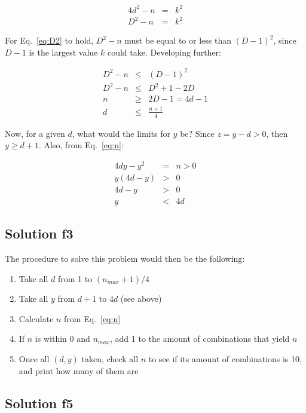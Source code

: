 \documentclass[english]{article}
\begin{document}
\begin{eqnarray}
4d^2 - n & = & k^2 \\
D^2 - n & = & k^2 \label{eq:D2}
\end{eqnarray}

For Eq.~\ref{eq:D2} to hold, $D^2 - n$ must be equal to or less than $(D-1)^2$, since $D-1$ is the largest value $k$ could take. Developing further:

\begin{eqnarray}
D^2 - n & \leq & (D-1)^2 \\
D^2 - n & \leq & D^2 + 1 -2D \\
n & \geq & 2D-1 = 4d-1 \\
d & \leq & \frac{n+1}{4}
\end{eqnarray}

Now, for a given $d$, what would the limits for $y$ be? Since $z = y-d > 0$, then $y \geq d + 1$. Also, from Eq.~\ref{eq:n}:

\begin{eqnarray}
4 d y - y^2 & = & n > 0 \\
y(4d-y) & > & 0 \\
4d - y & > & 0 \\
y & < & 4d
\end{eqnarray}

\subsection{Solution f3}

The procedure to solve this problem would then be the following:

\begin{enumerate}
  \item Take all $d$ from 1 to $(n_{max}+1)/4$
  \item Take all $y$ from $d+1$ to $4d$ (see above)
  \item Calculate $n$ from Eq.~\ref{eq:n}
  \item If $n$ is within 0 and $n_{max}$, add 1 to the amount of combinations that yield $n$
  \item Once all $(d, y)$ taken, check all $n$ to see if its amount of combinations is 10, and print how many of them are
\end{enumerate}

\subsection{Solution f5}
\end{document}
